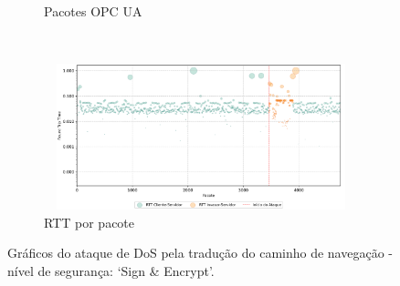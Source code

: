 \begin{apendicesenv}
\begin{figure}[htbp!]
\begin{subfigure}[t]{0.5\textwidth}
        \caption{Pacotes OPC UA}
    \end{subfigure}%
    ~
    \begin{subfigure}[t]{0.5\textwidth}
        \centering
        \includegraphics[width=1\textwidth, height=120pt]{USPSC-img/output/cropped/2-dos_translate_browse_path_call_stack_overflow-rttp.png}
        \caption{RTT por pacote}
    \end{subfigure}%
    \label{fig:2-dos_translate_browse_path_call_stack_overflow}
    \caption{Gráficos do ataque de DoS pela tradução do caminho de navegação - nível de segurança: `Sign \& Encrypt'.}
\end{figure}


\end{apendicesenv}
